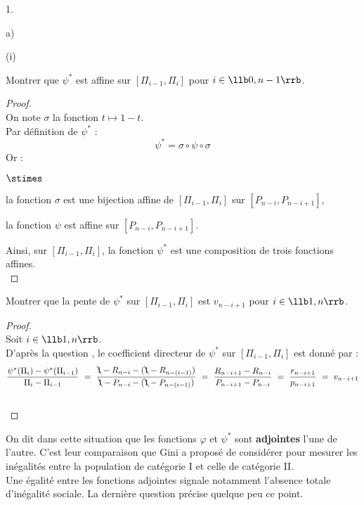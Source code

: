 \begin{noliste}{1.}
\begin{noliste}{a)}
\begin{nonoliste}{(i)}
   
   \item Montrer que $\psi^*$ est affine sur $[\Pi_{i-1}, \Pi_i]$ pour 
   $i \in \llb 0,n-1 \rrb$. 
   
   \begin{proof}~\\
     On note $\sigma$ la fonction $t\mapsto 1 - t$.\\
     Par définition de $\psi^*$ : 
     \[
      \psi^* = \sigma \circ \psi \circ \sigma
     \]
     Or : 
     \begin{noliste}{$\stimes$}
     \item la fonction $\sigma$ est une bijection affine de 
      $[\Pi_{i-1},\Pi_i]$ sur $[P_{n-i},P_{n-i+1}]$, 
     \item la fonction $\psi$ est affine sur $[P_{n-i}, P_{n-i+1}]$. 
     \end{noliste}
     Ainsi, sur $[\Pi_{i-1},\Pi_i]$, la fonction $\psi^*$ est une 
     composition de trois fonctions affines.
     ~\\[-1cm]
   \end{proof}

   
   \item Montrer que la pente de $\psi^*$ sur $[\Pi_{i-1}, \Pi_i]$ est 
   $v_{n-i+1}$ pour $i \in \llb 1,n \rrb$. 
   
   \begin{proof}~\\
     Soit $i \in \llb 1,n \rrb$.\\
    D'après la question , le coefficient directeur de 
    $\psi^*$ sur $[\Pi_{i-1},
    \Pi_i]$ est donné par :
    \[
      \dfrac{\psi^*(\Pi_i)-\psi^*(\Pi_{i-1})}{\Pi_i - \Pi_{i-1}} \ = \ 
      \dfrac{\bcancel{1}-R_{n-i}-(\bcancel{1}-R_{n-(i-1)})}
      {\bcancel{1}-P_{n-i}-(\bcancel{1}-P_{n-(i-1)})} \ = \
      \dfrac{R_{n-i+1}-R_{n-i}}{P_{n-i+1}-P_{n-i}}
      \ = \ \dfrac{r_{n-i+1}}{p_{n-i+1}} \ = \ v_{n-i+1}
    \]
    ~\\[-1cm]
   \end{proof}
  \end{nonoliste}

  \noindent
  On dit dans cette situation que les fonctions $\varphi$ et $\psi^*$ 
  sont \textbf{adjointes} l'une de l'autre. C'est leur comparaison que 
  Gini a proposé de considérer pour \og mesurer les inégalités \fg{} 
  entre la population de catégorie I et celle de catégorie II. \\
  Une égalité entre les fonctions adjointes signale notamment l'absence 
  totale d'inégalité sociale. La dernière question précise quelque peu 
  ce point. 
 \end{noliste}
 

\end{noliste}
